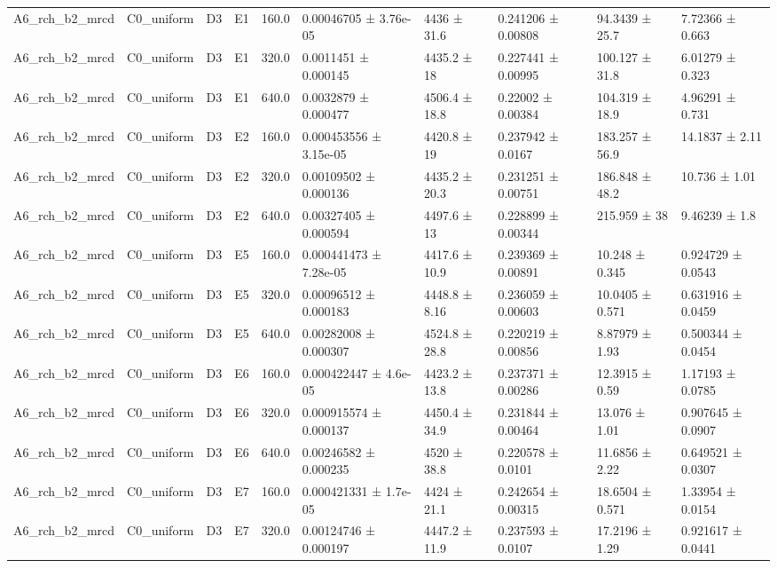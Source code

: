 \begin{table}
\begin{tabular}{llllllllll}
A6\_rch\_b2\_mrcd & C0\_uniform & D3 & E1 & 160.0 & 0.00046705 ± 3.76e-05 & 4436 ± 31.6 & 0.241206 ± 0.00808 & 94.3439 ± 25.7 & 7.72366 ± 0.663 \\
A6\_rch\_b2\_mrcd & C0\_uniform & D3 & E1 & 320.0 & 0.0011451 ± 0.000145 & 4435.2 ± 18 & 0.227441 ± 0.00995 & 100.127 ± 31.8 & 6.01279 ± 0.323 \\
A6\_rch\_b2\_mrcd & C0\_uniform & D3 & E1 & 640.0 & 0.0032879 ± 0.000477 & 4506.4 ± 18.8 & 0.22002 ± 0.00384 & 104.319 ± 18.9 & 4.96291 ± 0.731 \\
A6\_rch\_b2\_mrcd & C0\_uniform & D3 & E2 & 160.0 & 0.000453556 ± 3.15e-05 & 4420.8 ± 19 & 0.237942 ± 0.0167 & 183.257 ± 56.9 & 14.1837 ± 2.11 \\
A6\_rch\_b2\_mrcd & C0\_uniform & D3 & E2 & 320.0 & 0.00109502 ± 0.000136 & 4435.2 ± 20.3 & 0.231251 ± 0.00751 & 186.848 ± 48.2 & 10.736 ± 1.01 \\
A6\_rch\_b2\_mrcd & C0\_uniform & D3 & E2 & 640.0 & 0.00327405 ± 0.000594 & 4497.6 ± 13 & 0.228899 ± 0.00344 & 215.959 ± 38 & 9.46239 ± 1.8 \\
A6\_rch\_b2\_mrcd & C0\_uniform & D3 & E5 & 160.0 & 0.000441473 ± 7.28e-05 & 4417.6 ± 10.9 & 0.239369 ± 0.00891 & 10.248 ± 0.345 & 0.924729 ± 0.0543 \\
A6\_rch\_b2\_mrcd & C0\_uniform & D3 & E5 & 320.0 & 0.00096512 ± 0.000183 & 4448.8 ± 8.16 & 0.236059 ± 0.00603 & 10.0405 ± 0.571 & 0.631916 ± 0.0459 \\
A6\_rch\_b2\_mrcd & C0\_uniform & D3 & E5 & 640.0 & 0.00282008 ± 0.000307 & 4524.8 ± 28.8 & 0.220219 ± 0.00856 & 8.87979 ± 1.93 & 0.500344 ± 0.0454 \\
A6\_rch\_b2\_mrcd & C0\_uniform & D3 & E6 & 160.0 & 0.000422447 ± 4.6e-05 & 4423.2 ± 13.8 & 0.237371 ± 0.00286 & 12.3915 ± 0.59 & 1.17193 ± 0.0785 \\
A6\_rch\_b2\_mrcd & C0\_uniform & D3 & E6 & 320.0 & 0.000915574 ± 0.000137 & 4450.4 ± 34.9 & 0.231844 ± 0.00464 & 13.076 ± 1.01 & 0.907645 ± 0.0907 \\
A6\_rch\_b2\_mrcd & C0\_uniform & D3 & E6 & 640.0 & 0.00246582 ± 0.000235 & 4520 ± 38.8 & 0.220578 ± 0.0101 & 11.6856 ± 2.22 & 0.649521 ± 0.0307 \\
A6\_rch\_b2\_mrcd & C0\_uniform & D3 & E7 & 160.0 & 0.000421331 ± 1.7e-05 & 4424 ± 21.1 & 0.242654 ± 0.00315 & 18.6504 ± 0.571 & 1.33954 ± 0.0154 \\
A6\_rch\_b2\_mrcd & C0\_uniform & D3 & E7 & 320.0 & 0.00124746 ± 0.000197 & 4447.2 ± 11.9 & 0.237593 ± 0.0107 & 17.2196 ± 1.29 & 0.921617 ± 0.0441 \\

\end{tabular}
\end{table}
